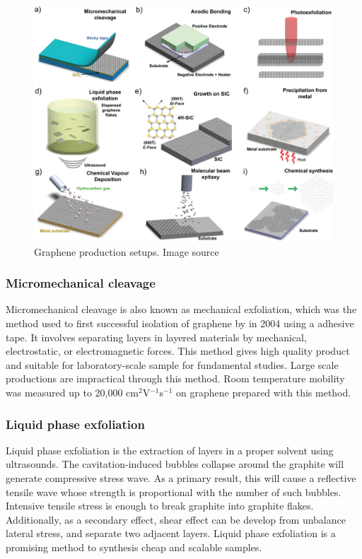 \begin{figure}[htbp!] 
\centering  
\includegraphics[width=\textwidth]{synthesis.png}
\caption{Graphene production setups. Image source \cite{Ferrari2015}}  
\label{fig:syn}
\end{figure} 
\subsubsection{Micromechanical cleavage}

Micromechanical cleavage is also known as mechanical exfoliation, which was the method used to first successful isolation of graphene by \citet{Novoselov26072005} in 2004 using a adhesive tape. It involves separating layers in layered materials by mechanical, electrostatic, or electromagnetic forces. This method gives high quality product and suitable for laboratory-scale sample for fundamental studies. Large scale productions are impractical through this method.  Room temperature mobility was measured up to 20,000 cm$^2$V$^{-1}$s$^{-1}$\cite{Ni2010} on graphene prepared with this method.

\subsubsection{Liquid phase exfoliation}

Liquid phase exfoliation is the extraction of layers in a proper solvent using ultrasounds. The cavitation-induced bubbles collapse around the graphite will generate compressive stress wave. As a primary result, this will cause a reflective tensile wave whose strength is proportional with the number of such bubbles. Intensive tensile stress is enough to break graphite into graphite flakes. Additionally, as a secondary effect, shear effect can be develop from unbalance lateral stress, and separate two adjacent layers. Liquid phase exfoliation is a promising method to synthesis cheap and scalable samples. 


